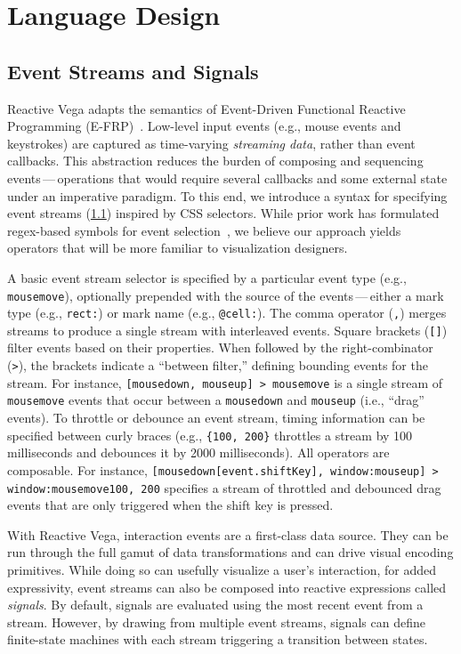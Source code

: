 \section{Language Design}
\label{sec:vg:lang}
\subsection{Event Streams and Signals}

Reactive Vega adapts the semantics of Event-Driven Functional Reactive
Programming (E-FRP)~\cite{wan:efrp}. Low-level input events (e.g., mouse events
and keystrokes) are captured as time-varying \emph{streaming data}, rather than
event callbacks. This abstraction reduces the burden of composing and sequencing
events\,---\,operations that would require several callbacks and some external
state under an imperative paradigm. To this end, we introduce a syntax for
specifying event streams (\cref{}) inspired by CSS selectors.
While prior work has formulated regex-based symbols for event
selection~\cite{kin:proton++}, we believe our approach yields operators that
will be more familiar to visualization designers.

A basic event stream selector is specified by a particular event type (e.g.,
\texttt{mousemove}), optionally prepended with the source of the
events\,---\,either a mark type (e.g., \texttt{rect:}) or mark name (e.g.,
\texttt{@cell:}). The comma operator (\texttt{,}) merges streams to produce a
single stream with interleaved events. Square brackets (\texttt{[]}) filter
events based on their properties. When followed by the right-combinator
(\texttt{>}), the brackets indicate a ``between filter,'' defining bounding
events for the stream. For instance, \texttt{[mousedown, mouseup] > mousemove}
is a single stream of \texttt{mousemove} events that occur between a
\texttt{mousedown} and \texttt{mouseup} (i.e., ``drag'' events). To throttle or
debounce an event stream, timing information can be specified between curly
braces (e.g., \texttt{\{100, 200\}} throttles a stream by 100 milliseconds and
debounces it by 2000 milliseconds).  All operators are composable. For instance,
\texttt{[mousedown[event.shiftKey], window:mouseup] > window:mousemove{100,
200}} specifies a stream of throttled and debounced drag events that are only
triggered when the shift key is pressed.

With Reactive Vega, interaction events are a first-class data source. They can
be run through the full gamut of data transformations and can drive visual
encoding primitives. While doing so can usefully visualize a user's interaction,
for added expressivity, event streams can also be composed into reactive
expressions called \emph{signals}. By default, signals are evaluated using the
most recent event from a stream. However, by drawing from multiple event
streams, signals can define finite-state machines with each stream triggering a
transition between states.

